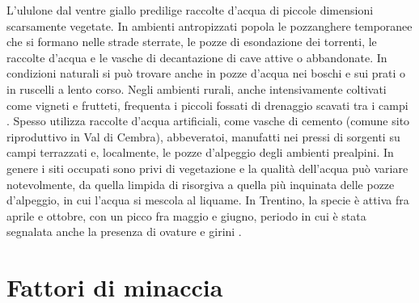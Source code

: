 \documentclass[10pt,twoside,openany,x11names,svgnames,italian,a5paper,dvipsnames,table]{memoir}
\newcommand\chapterillustration{}
\begin{document}
L'ululone dal ventre giallo predilige raccolte d'acqua di piccole dimensioni scarsamente vegetate. In ambienti antropizzati popola le pozzanghere temporanee che si formano nelle strade sterrate, le pozze di esondazione dei torrenti, le raccolte d'acqua e le vasche di decantazione di cave attive o abbandonate. In condizioni naturali si può trovare anche in pozze d’acqua nei boschi e sui prati o in ruscelli a lento corso. Negli ambienti rurali, anche intensivamente coltivati come vigneti e frutteti, frequenta i piccoli fossati di drenaggio scavati tra i campi \cite{AAVV04} \cite{Bellon08a} \cite{Biasioli11} \cite{Bovero13}. Spesso utilizza raccolte d'acqua artificiali, come vasche di cemento (comune sito riproduttivo in Val di Cembra), abbeveratoi, manufatti nei pressi di sorgenti su campi terrazzati e, localmente, le pozze d'alpeggio degli ambienti prealpini. In genere i siti occupati sono privi di vegetazione e la qualità dell'acqua può variare notevolmente, da quella limpida di risorgiva a quella più inquinata delle pozze d'alpeggio, in cui l’acqua si mescola al liquame. In Trentino, la specie è attiva fra aprile e ottobre, con un picco fra maggio e giugno, periodo in cui è stata segnalata anche la presenza di ovature e girini \cite{Caldonazzi02}.

 
\setlength\afterchapskip{52mm}
\chapter{Fattori di minaccia}
\renewcommand\chapterillustration{5.JPG}
\end{document}
